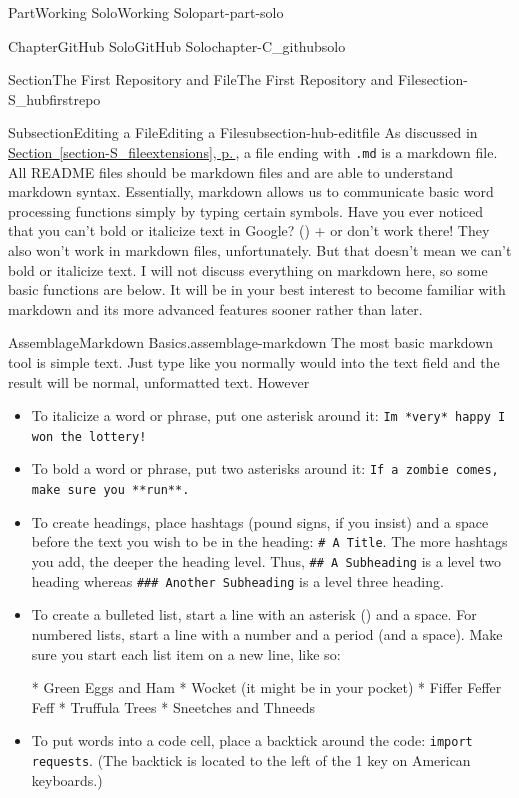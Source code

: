 \documentclass[twoside,10pt,]{book}
\newcommand{\xreffont}{\relax}
\newcommand{\mono}[1]{\texttt{#1}}
\newcommand{\kbd}[1]{\keys{{#1}}}
\begin{document}
\begin{partptx}{Part}{Working Solo}{}{Working Solo}{}{}{part-part-solo}
\begin{chapterptx}{Chapter}{GitHub Solo}{}{GitHub Solo}{}{}{chapter-C_githubsolo}
\begin{sectionptx}{Section}{The First Repository and File}{}{The First Repository and File}{}{}{section-S_hubfirstrepo}
\begin{subsectionptx}{Subsection}{Editing a File}{}{Editing a File}{}{}{subsection-hub-editfile}
As discussed in \hyperref[section-S_fileextensions]{Section~{\xreffont\ref{section-S_fileextensions}}, p.\,\pageref{section-S_fileextensions}}, a file ending with \mono{.md} is a markdown file. All README files should be markdown files and are able to understand markdown syntax. Essentially, markdown allows us to communicate basic word processing functions simply by typing certain symbols. Have you ever noticed that you can't bold or italicize text in Google? \kbd{Control} (\kbd{Command}) + \kbd{B} or \kbd{I} don't work there! They also won't work in markdown files, unfortunately. But that doesn't mean we can't bold or italicize text. I will not discuss everything on markdown here, so some basic functions are below. It will be in your best interest to become familiar with markdown and its more advanced features sooner rather than later.%
\begin{assemblage}{Assemblage}{Markdown Basics.}{assemblage-markdown}%
The most basic markdown tool is simple text. Just type like you normally would into the text field and the result will be normal, unformatted text. However\textellipsis{}%
\begin{itemize}[label=\textbullet]
\item{}To italicize a word or phrase, put one asterisk around it: \mono{I\textquotesingle{}m *very* happy I won the lottery!}%
\item{}To bold a word or phrase, put two asterisks around it: \mono{If a zombie comes, make sure you **run**.}%
\item{}To create headings, place hashtags (pound signs, if you insist) and a space before the text you wish to be in the heading: \mono{\# A Title}. The more hashtags you add, the deeper the heading level. Thus, \mono{\#\# A Subheading} is a level two heading whereas \mono{\#\#\# Another Subheading} is a level three heading.%
\item{}To create a bulleted list, start a line with an asterisk (\textasteriskcentered{}) and a space. For numbered lists, start a line with a number and a period (and a space). Make sure you start each list item on a new line, like so:%
\begin{codedisplay}
* Green Eggs and Ham
* Wocket (it might be in your pocket)
* Fiffer Feffer Feff
* Truffula Trees
* Sneetches and Thneeds
\end{codedisplay}
%
\item{}To put words into a code cell, place a backtick around the code: \mono{\textasciigrave{}import requests\textasciigrave{}}. (The backtick is located to the left of the 1 key on American keyboards.)%

\end{itemize}
\end{assemblage}
\end{subsectionptx}
\end{sectionptx}
\end{chapterptx}
\end{partptx}
\end{document}
